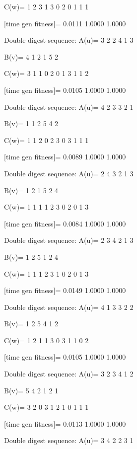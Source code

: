 C(w)=
     1     2     3     1     3     0     2     0     1     1     1

[time gen fitness]=
    0.0111    1.0000    1.0000

Double digest sequence:
A(u)=
     3     2     2     4     1     3

B(v)=
     4     1     2     1     5     2

C(w)=
     3     1     1     0     2     0     1     3     1     1     2

[time gen fitness]=
    0.0105    1.0000    1.0000

Double digest sequence:
A(u)=
     4     2     3     3     2     1

B(v)=
     1     1     2     5     4     2

C(w)=
     1     1     2     0     2     3     0     3     1     1     1

[time gen fitness]=
    0.0089    1.0000    1.0000

Double digest sequence:
A(u)=
     2     4     3     2     1     3

B(v)=
     1     2     1     5     2     4

C(w)=
     1     1     1     1     2     3     0     2     0     1     3

[time gen fitness]=
    0.0084    1.0000    1.0000

Double digest sequence:
A(u)=
     2     3     4     2     1     3

B(v)=
     1     2     5     1     2     4

C(w)=
     1     1     1     2     3     1     0     2     0     1     3

[time gen fitness]=
    0.0149    1.0000    1.0000

Double digest sequence:
A(u)=
     4     1     3     3     2     2

B(v)=
     1     2     5     4     1     2

C(w)=
     1     2     1     1     3     0     3     1     1     0     2

[time gen fitness]=
    0.0105    1.0000    1.0000

Double digest sequence:
A(u)=
     3     2     3     4     1     2

B(v)=
     5     4     2     1     2     1

C(w)=
     3     2     0     3     1     2     1     0     1     1     1

[time gen fitness]=
    0.0113    1.0000    1.0000

Double digest sequence:
A(u)=
     3     4     2     2     3     1

